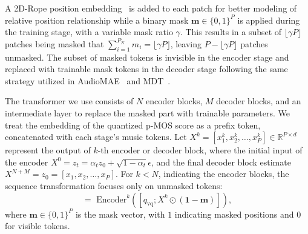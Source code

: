 A 2D-Rope position embedding~\citep{su2024roformer} is added to each patch for better modeling of relative position relationship while a binary mask \(\boldsymbol{m} \in \{0, 1\}^{P}\) is applied during the training stage, with a variable mask ratio \(\gamma\). This results in a subset of \(\lfloor \gamma P \rfloor\) patches being masked that \(\sum_{i=1}^{P_N} m_i = \lfloor \gamma P \rfloor\), leaving \(P - \lfloor \gamma P \rfloor\) patches unmasked. The subset of masked tokens is invisible in the encoder stage and replaced with trainable mask tokens in the decoder stage following the same strategy utilized in AudioMAE~\citep{huang2022masked} and MDT~\citep{gao2023masked}.

The transformer we use consists of \(N\)  encoder blocks, \(M\) decoder blocks, and an intermediate layer to replace the masked part with trainable parameters. We treat the embedding of the quantized p-MOS score as a prefix token, concatenated with each stage's music tokens. Let \({X}^k = [{x}^k_1, {x}^k_2, \ldots, {x}^k_{P}] \in \mathbb{R}^{P \times d}\) represent the output of \(k\)-th  encoder or decoder block, where the initial input of the encoder \(X^0=z_t=\alpha_t{z}_0 + \sqrt{1-\alpha_t}\epsilon\), and the final decoder block estimate  \(X^{N+M}=z_0 = [{x}_1, {x}_2, \ldots, {x}_{P}]\).
For \( k < N \), indicating the encoder blocks, the sequence transformation focuses only on unmasked tokens:
\begin{equation}
[q_\text{vq}^{k+1}; {X}^{k+1}] = \text{ Encoder}^k\left(\left[q_\text{vq}; {X}^k \odot (\mathbf{1} - \boldsymbol{m})\right]\right),
\end{equation}
where \(\boldsymbol{m} \in \{0, 1\}^P\) is the mask vector, with \(1\) indicating masked positions and \(0\) for visible tokens.

